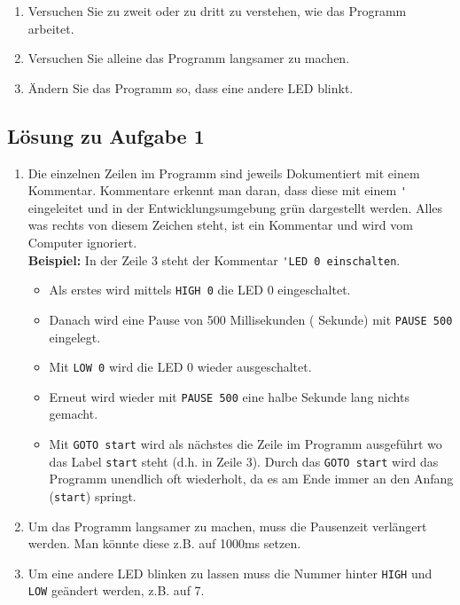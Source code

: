 \noindent

\begin{enumerate}[label=(\alph*)]
	\item Versuchen Sie zu zweit oder zu dritt zu verstehen, wie das
	Programm arbeitet.
	\item Versuchen Sie alleine das Programm langsamer zu machen.
	\item Ändern Sie das Programm so, dass eine andere LED blinkt.
\end{enumerate}

\ifteacher
\newpage
\subsection{Lösung zu Aufgabe 1}
\begin{enumerate}[label=(\alph*)]
	\item Die einzelnen Zeilen im Programm sind jeweils Dokumentiert
	mit einem Kommentar. Kommentare erkennt man daran, dass diese mit
	einem \lstinline{'} eingeleitet und in der Entwicklungsumgebung
	grün dargestellt werden. Alles was rechts von diesem 
	Zeichen steht, ist ein Kommentar und wird vom Computer ignoriert.\\
	\textbf{Beispiel:} In der Zeile 3 steht der Kommentar 
	\lstinline{'LED 0 einschalten}.
	\begin{itemize}
		\item Als erstes wird mittels \lstinline{HIGH 0} die LED 0 
		eingeschaltet.
		\item Danach wird eine Pause von 500 Millisekunden 
		( Sekunde) mit \lstinline{PAUSE 500} eingelegt.
		\item Mit \lstinline{LOW 0} wird die LED 0 wieder ausgeschaltet.
		\item Erneut wird wieder mit \lstinline{PAUSE 500} eine halbe
		Sekunde lang nichts gemacht.
		\item Mit \lstinline{GOTO start} wird als nächstes die Zeile
		im Programm ausgeführt wo das Label \lstinline{start} steht
		(d.h. in Zeile 3). Durch das \lstinline{GOTO start} wird das
		Programm unendlich oft wiederholt, da es am Ende immer an den
		Anfang (\lstinline{start}) springt.
	\end{itemize}
	\item Um das Programm langsamer zu machen, muss die Pausenzeit
	verlängert werden. Man könnte diese z.B. auf 1000ms setzen.
	
	\item Um eine andere LED blinken zu lassen muss die Nummer hinter 
	\lstinline{HIGH} und \lstinline{LOW} geändert werden, z.B. auf 7.
	
\end{enumerate}
\fi

